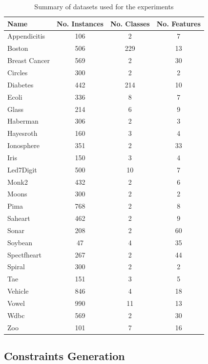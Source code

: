 \documentclass[review]{elsarticle}
\begin{document}
\begin{table}[!h]
	\centering
	\small
	\begin{tabular}{l c c c}
		\hline
		Name & No. Instances & No. Classes & No. Features \\
		\hline
		Appendicitis & 106 & 2 & 7 \\
		Boston & 506 & 229 & 13 \\
		Breast Cancer & 569 & 2 & 30 \\
		Circles & 300 & 2 & 2 \\
		Diabetes & 442 & 214 & 10 \\
		Ecoli & 336 & 8 & 7 \\
		Glass & 214 & 6 & 9 \\
		Haberman & 306 & 2 & 3 \\
		Hayesroth & 160 & 3 & 4 \\
		Ionosphere & 351 & 2 & 33 \\
		Iris & 150 & 3 & 4 \\
		Led7Digit & 500 & 10 & 7 \\
		Monk2 & 432 & 2 & 6 \\
		Moons & 300 & 2 & 2 \\
		Pima & 768 & 2 & 8 \\
		Saheart & 462 & 2 & 9 \\
		Sonar & 208 & 2 & 60 \\
		Soybean & 47 & 4 & 35 \\
		Spectfheart & 267 & 2 & 44 \\
		Spiral & 300 & 2 & 2 \\
		Tae & 151 & 3 & 5 \\
		Vehicle & 846 & 4 & 18 \\
		Vowel & 990 & 11 & 13 \\
		Wdbc & 569 & 2 & 30 \\
		Zoo & 101 & 7 & 16 \\
		\hline

	\end{tabular}%
	\caption{Summary of datasets used for the experiments \cite{triguero2017keel}\cite{scikit-learn}}
	\label{tab:datasets}
\end{table}

\clearpage

\subsection{Constraints Generation}
\end{document}
